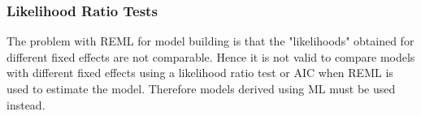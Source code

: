 \documentclass[12pt, a4paper]{report}
\theoremstyle{plain}
\theoremstyle{definition}
\theoremstyle{remark}
\begin{document}













\subsubsection{Likelihood Ratio Tests} The problem with REML for
model building is that the "likelihoods" obtained for different
fixed effects are not comparable. Hence it is not valid to compare
models with different fixed effects using a likelihood ratio test
or AIC when REML is used to estimate the model. Therefore models
derived using ML must be used instead.
\end{document}
